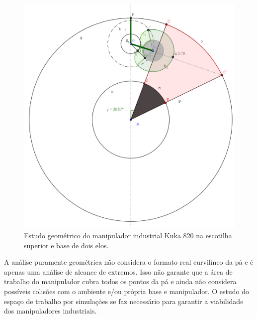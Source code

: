 \begin{figure}[h!]
\centering
	\includegraphics[width=\columnwidth]{figs/estudo/geometrico/kuka.png} 
	\caption{Estudo geométrico do manipulador industrial Kuka 820 na escotilha
	superior e base de dois elos.}
	\label{pakuka}
\end{figure}

A análise puramente geométrica não considera o formato real curvilíneo da pá e
é apenas uma análise de alcance de extremos. Isso não garante que a área de
trabalho do manipulador cubra todos os pontos da pá e ainda não considera
possíveis colisões com o ambiente e/ou própria base e manipulador. O estudo do
espaço de trabalho por simulações se faz necessário para garantir a viabilidade
dos manipuladores industriais.
